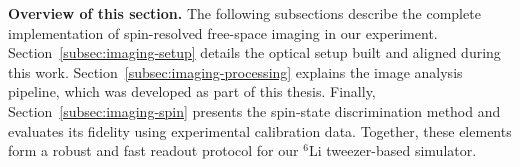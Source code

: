 \textbf{Overview of this section.}  
The following subsections describe the complete implementation of spin-resolved free-space imaging in our experiment. Section~\ref{subsec:imaging-setup} details the optical setup built and aligned during this work. Section~\ref{subsec:imaging-processing} explains the image analysis pipeline, which was developed as part of this thesis. Finally, Section~\ref{subsec:imaging-spin} presents the spin-state discrimination method and evaluates its fidelity using experimental calibration data. Together, these elements form a robust and fast readout protocol for our ${}^6$Li tweezer-based simulator.









